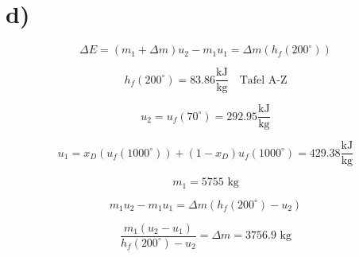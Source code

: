 

\section*{d)}

\[
\Delta E = (m_1 + \Delta m) u_2 - m_1 u_1 = \Delta m \left( h_f \left( 200^\circ \right) \right)
\]

\[
h_f \left( 200^\circ \right) = 83.86 \frac{\text{kJ}}{\text{kg}} \quad \text{Tafel A-Z}
\]

\[
u_2 = u_f \left( 70^\circ \right) = 292.95 \frac{\text{kJ}}{\text{kg}}
\]

\[
u_1 = x_D \left( u_f \left( 1000^\circ \right) \right) + (1 - x_D) u_f \left( 1000^\circ \right) = 429.38 \frac{\text{kJ}}{\text{kg}}
\]

\[
m_1 = 5755 \text{ kg}
\]

\[
m_1 u_2 - m_1 u_1 = \Delta m \left( h_f \left( 200^\circ \right) - u_2 \right)
\]

\[
\frac{m_1 (u_2 - u_1)}{h_f \left( 200^\circ \right) - u_2} = \Delta m = 3756.9 \text{ kg}
\]